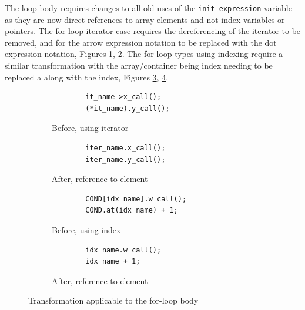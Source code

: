\documentclass[bsc,frontabs,singlespacing,twoside,parskip,deptreport]{infthesis}
\begin{document}
The loop body requires changes to all old uses of the \texttt{init-expression} variable as they are now direct references to array elements and not index variables or pointers. The for-loop iterator case requires the dereferencing of the iterator to be removed, and for the arrow expression notation to be replaced with the dot expression notation, Figures \ref{fig:before-tran-iter}, \ref{fig:after-tran-iter}. The for loop types using indexing require a similar transformation with the array/container being index needing to be replaced a along with the index, Figures \ref{fig:before-tran-idx}, \ref{fig:after-tran-idx}.

\begin{figure}[H]
    \centering
  \begin{subfigure}[t]{0.45\textwidth}
        \centering
        \begin{verbatim}
        it_name->x_call();
        (*it_name).y_call();
        \end{verbatim}
        \caption{Before, using iterator}
        \label{fig:before-tran-iter}
        \vspace{0.40cm}
    \end{subfigure}
    \hfill
    \begin{subfigure}[t]{0.45\textwidth}
        \begin{verbatim}
        iter_name.x_call();
        iter_name.y_call();
        \end{verbatim}
        \caption{After, reference to element}
        \centering
        \label{fig:after-tran-iter}
    \end{subfigure}
    
     \begin{subfigure}[t]{0.45\textwidth}
        \centering
        \begin{verbatim}
        COND[idx_name].w_call();
        COND.at(idx_name) + 1;
        \end{verbatim}
        \caption{Before, using index}
        \label{fig:before-tran-idx}
        \vspace{0.40cm}
    \end{subfigure}
    \hfill
    \begin{subfigure}[t]{0.45\textwidth}
        \begin{verbatim}
        idx_name.w_call();
        idx_name + 1;
        \end{verbatim}
        \caption{After, reference to element}
        \centering
        \label{fig:after-tran-idx}
    \end{subfigure}

    \caption{Transformation applicable to the for-loop body}
    \label{fig:code-trans-loop-body}
\end{figure}
\end{document}
